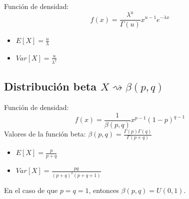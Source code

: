 \documentclass[11pt,twoside,titlepage,a4paper]{article}
\theoremstyle{definition}
\theoremstyle{plain_rojo}
\theoremstyle{remark}
\begin{document}
Función de densidad:
\begin{equation*}
f(x)=\frac{\lambda^u}{\Gamma(u)}x^{u-1}e^{-\lambda x}
\end{equation*}
\begin{multicols}{2}
	\begin{itemize}[label={}]
		\item $E[X]=\displaystyle\frac u\lambda$
		\item $Var[X]=\displaystyle\frac{u}{\lambda^2}$
	\end{itemize}
\end{multicols}

\subsection{Distribución beta $X\rightsquigarrow \beta(p,q)$}

Función de densidad:
\begin{equation*}
f(x)=\frac{1}{\beta(p,q)}x^{p-1}(1-p)^{q-1}
\end{equation*}
Valores de la función beta: $\beta(p,q)=\displaystyle\frac{\Gamma(p)\Gamma(q)}{\Gamma(p+q)}$
\begin{multicols}{2}
	\begin{itemize}[label={}]
		\item $E[X]=\displaystyle\frac{p}{p+q}$
		\item $Var[X]=\displaystyle\frac{pq}{(p+q)^2(p+q+1)}$
	\end{itemize}
\end{multicols}
En el caso de que $p=q=1$, entonces $\beta(p,q)=U(0,1)$.
\end{document}
